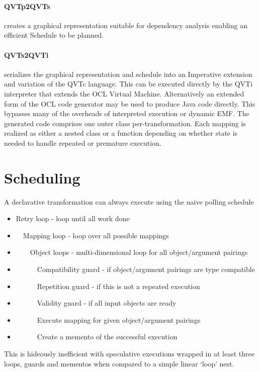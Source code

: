 \documentclass{llncs}
\begin{document}
\paragraph{QVTp2QVTs} creates a graphical representation suitable for dependency analysis enabling an efficient Schedule to be planned.

\paragraph{QVTs2QVTi} serializes the graphical representation and schedule into an Imperative extension and variation of the QVTc language. This can be executed directly by the QVTi interpreter that extends the OCL Virtual Machine. Alternatively an extended form of the OCL code generator may be used to produce Java code directly. This bypasses many of the overheads of interpreted execution or dynamic EMF. The generated code comprises one outer class per-transformation. Each mapping is realized as either a nested class or a function depending on whether state is needed to handle repeated or premature execution.

\section{Scheduling}\label{Scheduling}

A declarative transformation can always execute using the naive polling schedule
\begin{itemize}
\item Retry loop - loop until all work done
\item ~~Mapping loop - loop over all possible mappings 
\item ~~~~Object loops - multi-dimensional loop for all object/argument pairings
\item ~~~~~~Compatibility guard - if object/argument pairings are type compatible
\item ~~~~~~Repetition guard - if this is not a repeated execution
\item ~~~~~~Validity guard - if all input objects are ready
\item ~~~~~~Execute mapping for given object/argument pairings
\item ~~~~~~Create a memento of the successful execution
\end{itemize}

This is hideously inefficient with speculative executions wrapped in at least three loops, guards and mementos when compared to a simple linear `loop' nest.
\end{document}
